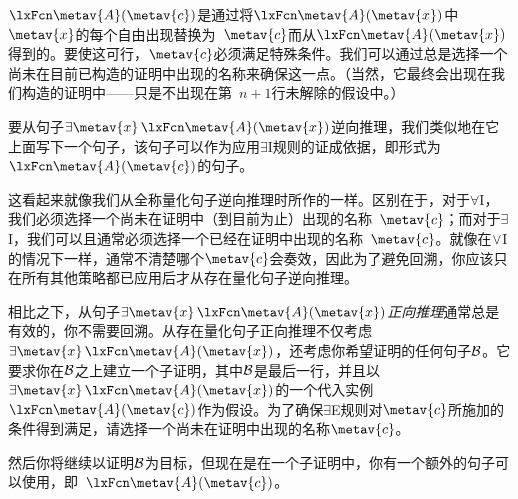 \begin{fitchproof}
	\ellipsesline
\end{fitchproof}


$\atom{\metav{A}}{\metav{c}}$是通过将$\atom{\metav{A}}{\metav{x}}$中$\metav{x}$的每个自由出现替换为~$\metav{c}$而从$\atom{\metav{A}}{\metav{x}}$得到的。要使这可行，$\metav{c}$必须满足特殊条件。我们可以通过总是选择一个尚未在目前已构造的证明中出现的名称来确保这一点。（当然，它最终会出现在我们构造的证明中——只是不出现在第~$n+1$行未解除的假设中。）

要从句子$\exists \metav{x}\, \atom{\metav{A}}{\metav{x}}$逆向推理，我们类似地在它上面写下一个句子，该句子可以作为应用$\exists$I规则的证成依据，即形式为$\atom{\metav{A}}{\metav{c}}$的句子。


\begin{fitchproof}
	\ellipsesline
\end{fitchproof}


这看起来就像我们从全称量化句子逆向推理时所作的一样。区别在于，对于$\forall$I，我们必须选择一个尚未在证明中（到目前为止）出现的名称~$\metav{c}$；而对于$\exists$I，我们可以且通常必须选择一个已经在证明中出现的名称~$\metav{c}$。就像在$\vee$I的情况下一样，通常不清楚哪个$\metav{c}$会奏效，因此为了避免回溯，你应该只在所有其他策略都已应用后才从存在量化句子逆向推理。

相比之下，从句子$\exists \metav{x}\, \atom{\metav{A}}{\metav{x}}$\emph{正向推理}通常总是有效的，你不需要回溯。从存在量化句子正向推理不仅考虑$\exists \metav{x}\, \atom{\metav{A}}{\metav{x}}$，还考虑你希望证明的任何句子$\mathcal{B}$。它要求你在$\mathcal{B}$之上建立一个子证明，其中$\mathcal{B}$是最后一行，并且以$\exists \metav{x}\, \atom{\metav{A}}{\metav{x}}$的一个代入实例$\atom{\metav{A}}{\metav{c}}$作为假设。为了确保$\exists$E规则对$\metav{c}$所施加的条件得到满足，请选择一个尚未在证明中出现的名称$\metav{c}$。


\begin{fitchproof}
	\ellipsesline
	\ellipsesline
	\open
	\AS
	\ellipsesline
	\close
\end{fitchproof}


然后你将继续以证明$\mathcal{B}$为目标，但现在是在一个子证明中，你有一个额外的句子可以使用，即~$\atom{\metav{A}}{\metav{c}}$。

